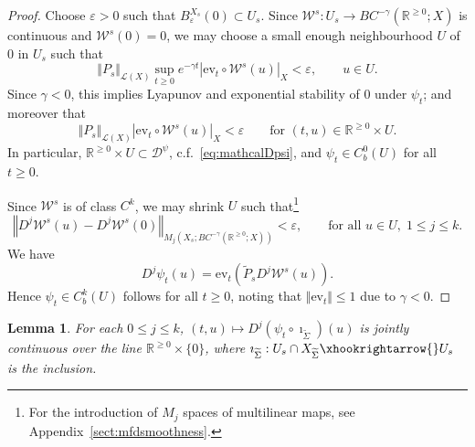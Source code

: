 \documentclass[a4paper, 12pt, oneside, reqno, notitlepage]{amsart}
\theoremstyle{plain}
\newtheorem{lemma}[theorem]{Lemma}
\theoremstyle{definition}
\theoremstyle{remark}
\begin{document}
\begin{proof}
        Choose $\varepsilon> 0$ such that $B_\varepsilon^{X_s}(0) \subset U_s$.
    Since $\mathcal{W}^s : U_s \to BC^{-\gamma}(\mathbb{R}^{\geq 0};X)$ is continuous and $\mathcal{W}^s(0) = 0$, we may choose a small enough neighbourhood $U$ of $0$ in $U_s$ such that 
    \begin{displaymath}
        \Vert P_s \Vert_{\mathcal{L}(X)}\sup_{t \geq 0} e^{-\gamma t} \left|\mathrm{ev}_t \circ \mathcal{W}^s(u) \right|_{X} < \varepsilon, \qquad u \in U.
    \end{displaymath}
    Since $\gamma < 0$, this implies Lyapunov and exponential stability of $0$ under $\psi_t$; and moreover that 
    \begin{displaymath}
        \Vert P_s \Vert_{\mathcal{L}(X)}\left| \mathrm{ev}_t \circ \mathcal{W}^s(u) \right|_{X} < \varepsilon \qquad  \text{for } (t,u) \in \mathbb{R}^{\geq 0} \times U.
    \end{displaymath}
    In particular, $\mathbb{R}^{\geq 0} \times U \subset \mathcal{D}^\psi$, c.f.\ \eqref{eq:mathcalDpsi}, and $\psi_t \in C^0_b(U)$ for all $t \geq 0$.

    Since $\mathcal{W}^s$ is of class $C^k$, we may shrink $U$ such that\footnote{For the introduction of $M_j$ spaces of multilinear maps, see Appendix~\ref{sect:mfdsmoothness}.}
    \begin{displaymath}
        \left\Vert D^{j} \mathcal{W}^s(u) - D^j \mathcal{W}^s(0) \right\Vert_{M_j(X_s;BC^{-\gamma}(\mathbb{R}^{\geq 0};X))} < \varepsilon, \qquad \text{for all } u \in U, \; 1 \leq j \leq k.
    \end{displaymath}
    We have
    \begin{displaymath}
        D^j \psi_t(u) = \mathrm{ev}_t \left( \widetilde{P}_s D^j \mathcal{W}^s(u) \right). 
    \end{displaymath}
    Hence $\psi_t \in C^k_b(U)$ follows for all $t \geq 0$, noting that $\Vert \mathrm{ev}_t\Vert \leq 1$ due to $\gamma < 0$.
\end{proof}


\begin{lemma} \label{lemma:jointcont}
    For each $0 \leq j \leq k$,  $(t,u) \mapsto D^j(\psi_t \circ \imath_{\widetilde{\Sigma}}) (u)$ is jointly continuous over the line $\mathbb{R}^{\geq 0} \times \{0\}$, where $\imath_{\widetilde{\Sigma}} : U_s \cap X_{\widetilde{\Sigma}} \xhookrightarrow{} U_s$ is the inclusion.
\end{lemma}
\end{document}

